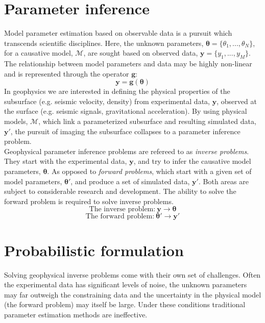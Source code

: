 \section{Parameter inference}

Model parameter estimation based on observable data is a pursuit which transcends scientific disciplines. Here, the unknown parameters, $\bm{\theta} = \{\theta_1,...,\theta_N\}$, for a causative model, $\mathcal{M}$, are sought based on observed data, $\bm{y} = \{y_1,...,y_M\}$. The relationship between model parameters and data may be highly non-linear and is represented through the operator $\bm{g}$:
\begin{equation}
\bm{y} = \bm{g}(\bm{\theta})
\label{basic_data_parameters}
\end{equation}	
In geophysics we are interested in defining the physical properties  of the subsurface (e.g. seismic velocity, density) from experimental data, $\bm{y}$, observed at the surface (e.g. seismic signals, gravitational acceleration). By using physical models, $\mathcal{M}$, which link a parameterized subsurface and resulting simulated data, $\bm{y'}$, the pursuit of imaging the subsurface collapses to a parameter inference problem.\\

Geophysical parameter inference problems are refereed to as \textit{inverse problems}. They start with the experimental data, $\bm{y}$, and try to infer the causative model parameters, $\bm{\theta}$. As opposed to \textit{forward problems}, which start with a given set of model parameters, $\bm{\theta'}$, and produce a set of simulated data, $\bm{y'}$. Both areas are subject to considerable research and development. The ability to solve the forward problem is required to solve inverse problems.\\
\begin{equation}
\text{The inverse problem:}\ \bm{y} \rightarrow \bm{\theta}
\label{inverse_problem}
\end{equation}
\begin{equation}
\text{The forward problem:}\ \bm{\theta'} \rightarrow \bm{y'}
\label{forward_problem}
\end{equation}

\section{Probabilistic formulation}

Solving geophysical inverse problems come with their own set of challenges. Often the experimental data has significant levels of noise, the unknown parameters may far outweigh the constraining data and the uncertainty in the physical model (the forward problem) may itself be large. Under these conditions traditional parameter estimation methods are ineffective.\\

